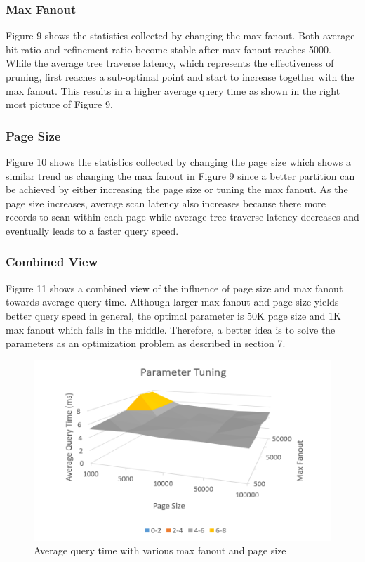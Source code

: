 \documentclass[sigconf,10pt]{acmart}
\begin{document}
\subsubsection{Max Fanout}

Figure 9 shows the statistics collected by changing the max fanout. Both average
hit ratio and refinement ratio become stable after max fanout reaches 5000. While
the average tree traverse latency, which represents the effectiveness of pruning,
first reaches a sub-optimal point and start to increase together with the max fanout.
This results in a higher average query time as shown in the right most picture of Figure 9.

\subsubsection{Page Size}

Figure 10 shows the statistics collected by changing the page size which shows
a similar trend as changing the max fanout in Figure 9 since a better partition
can be achieved by either increasing the page size or tuning the max fanout. As
the page size increases, average scan latency also increases because there more
records to scan within each page while average tree traverse latency decreases
and eventually leads to a faster query speed.

\subsubsection{Combined View}

Figure 11 shows a combined view of the influence of page size and max fanout towards
average query time. Although larger max fanout and page size yields better query speed
in general, the optimal parameter is 50K page size and 1K max fanout which falls in
the middle. Therefore, a better idea is to solve the parameters as an optimization
problem as described in section 7.

\begin{figure}
  \includegraphics[scale=0.6]{../figures/parameter/avg-qtime-3D2}
  \caption{Average query time with various max fanout and page size}
  \label{combined-view}
\end{figure}
\end{document}
